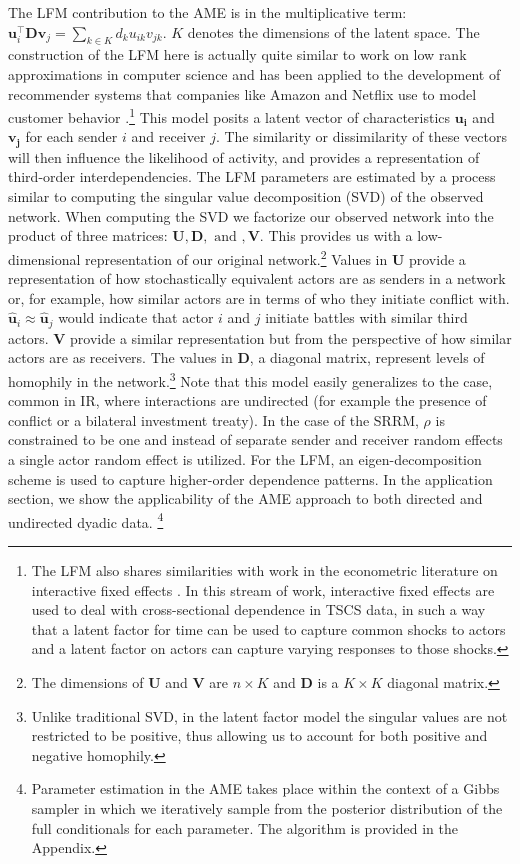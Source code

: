 The LFM contribution to the AME is in the multiplicative term: $\mathbf{u}_{i}^{\top} \mathbf{D} \mathbf{v}_{j}=\sum_{k \in K} d_{k} u_{ik} v_{jk}$. $K$ denotes the dimensions of the latent space. The construction of the LFM here is actually quite similar to work on low rank approximations in computer science and has been applied to the development of recommender systems that companies like Amazon and Netflix use to model customer behavior \citep{resnick:varian:1997,bennett:lanning:2007}.\footnote{The LFM also shares similarities with work in the econometric literature on interactive fixed effects \citep{bai:2009,pang:2014}. In this stream of work, interactive fixed effects are used to deal with cross-sectional dependence in TSCS data, in such a way that a latent factor for time can be used to capture common shocks to actors and a latent factor on actors can capture varying responses to those shocks.} This model posits a latent vector of characteristics
$\mathbf{u_{i}}$ and $\mathbf{v_{j}}$ for each sender $i$ and receiver $j$. The similarity or dissimilarity of these vectors will then influence the likelihood of activity, and provides a representation of third-order interdependencies. The LFM parameters are estimated by a process similar to computing the singular value decomposition (SVD) of the observed network. When computing the SVD we factorize our observed network into the product of three matrices: $\mathbf{U}, \mathbf{D}, \text{ and }, \mathbf{V}$. This provides us with a low-dimensional representation of our original network.\footnote{The dimensions of $\mathbf{U}$ and $\mathbf{V}$ are $n \times K$ and $\mathbf{D}$ is a $K \times K$ diagonal matrix.} Values in $\mathbf{U}$ provide a representation of how stochastically equivalent actors are as senders in a network or, for example, how similar actors are in terms of who they initiate conflict with. $\hat{\mathbf{u}}_{i} \approx \hat{\mathbf{u}}_{j}$ would indicate that actor $i$ and $j$ initiate battles with similar third actors. $\mathbf{V}$ provide a similar representation but from the perspective of how similar actors are as receivers. The values in $\mathbf{D}$, a diagonal matrix, represent levels of homophily in the network.\footnote{Unlike traditional SVD, in the latent factor model the singular values are not restricted to be positive, thus allowing us to account for both positive and negative homophily.} Note that this model easily generalizes to the case, common in IR, where interactions are undirected (for example the presence of conflict or a bilateral investment treaty). In the case of the SRRM, $\rho$ is constrained to be one and instead of separate sender and receiver random effects a single actor random effect is utilized. For the LFM, an eigen-decomposition scheme is used to capture higher-order dependence patterns. In the application section, we show the applicability of the AME approach to both directed and undirected dyadic data. \footnote{Parameter estimation in the AME takes place within the context of a Gibbs sampler in which we iteratively sample from the posterior distribution of the full conditionals for each parameter. The algorithm is provided in the Appendix.}

